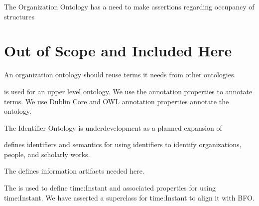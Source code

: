 \documentclass[letterpaper,10pt,english]{sphinxmanual}
\begin{document}
\begin{sphinxShadowBox}

\sphinxAtStartPar
The Organization Ontology has a need to make assertions regarding occupancy of
structures
\end{sphinxShadowBox}


\section{Out of Scope and Included Here}
\label{\detokenize{out-of-scope:out-of-scope-and-included-here}}
\sphinxAtStartPar
An organization ontology should reuse terms it needs from other ontologies.

\begin{sphinxShadowBox}

\sphinxAtStartPar
{} is used for an upper level ontology.  We use the  annotation properties to
annotate terms.  We use Dublin Core and OWL annotation properties annotate the
ontology.
\end{sphinxShadowBox}

\begin{sphinxShadowBox}

\sphinxAtStartPar
{} %
\begin{footnote}[1]\sphinxAtStartFootnote
The Identifier Ontology is underdevelopment as a planned expansion of 
%
\end{footnote}
defines identifiers and semantics for using
identifiers to identify organizations, people, and scholarly works.
\end{sphinxShadowBox}

\begin{sphinxShadowBox}

\sphinxAtStartPar
The  defines information artifacts needed here.
\end{sphinxShadowBox}

\begin{sphinxShadowBox}

\sphinxAtStartPar
The  is used to define time:Instant and associated properties for using
time:Instant.  We have asserted a superclass for time:Instant to align it with
BFO.
\end{sphinxShadowBox}
\end{document}
